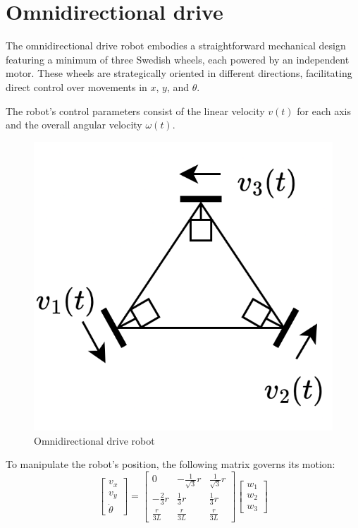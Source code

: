 \section{Omnidirectional drive}

The omnidirectional drive robot embodies a straightforward mechanical design featuring a minimum of three Swedish wheels, each powered by an independent motor.
These wheels are strategically oriented in different directions, facilitating direct control over movements in $x$, $y$, and $\theta$.

The robot's control parameters consist of the linear velocity $v(t)$ for each axis and the overall angular velocity $\omega(t)$. 
\begin{figure}[H]
    \centering
    \includegraphics[width=0.25\linewidth]{images/omni.png} 
    \caption{Omnidirectional drive robot}
\end{figure}
To manipulate the robot's position, the following matrix governs its motion:
\[\begin{bmatrix} v_x \\ v_y \\ \dot{\theta} \end{bmatrix} = 
\begin{bmatrix} 0 & -\frac{1}{\sqrt{3}}r & \frac{1}{\sqrt{3}}r \\ -\frac{2}{3}r & \frac{1}{3}r & \frac{1}{3}r \\ \frac{r}{3L} & \frac{r}{3L} & \frac{r}{3L} \end{bmatrix}
\begin{bmatrix} w_1 \\ w_2 \\ w_3 \end{bmatrix}\]
